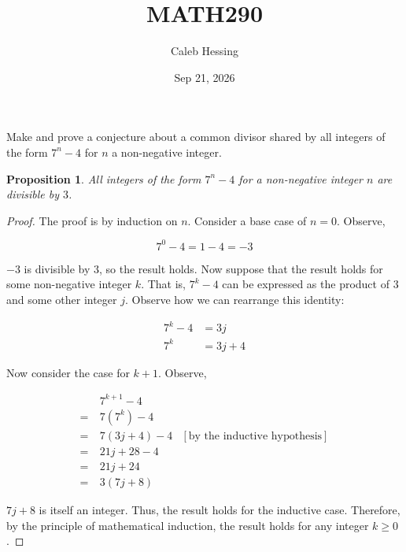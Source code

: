 \documentclass{article} %
\title{MATH290}
\author{Caleb Hessing}
\date{Sep 21, 2026}
\newtheorem{proposition}{Proposition}
\begin{document}
\maketitle

Make and prove a conjecture about a common divisor shared by all integers of the form
$7^n - 4$ for $n$ a non-negative integer.

\begin{proposition}
    All integers of the form $7^n - 4$ for a non-negative integer $n$ are divisible by $3$.
\end{proposition}

\begin{proof} The proof is by induction on $n$. Consider a base case of $n=0$. Observe,

    \[
        7^0 - 4 = 1 - 4 = -3 
    \]

    $-3$ is divisible by $3$, so the result holds. Now suppose that the result holds for some 
    non-negative integer $k$. That is, $7^k - 4$ can be expressed as the product of $3$ and 
    some other integer $j$. Observe how we can rearrange this identity:

    \[\begin{split}
        7^k - 4 &= 3j \\
        7^k &= 3j + 4
    \end{split}\]

    Now consider the case for $k+1$. Observe,

    \[\begin{aligned}
         &\ 7^{k+1} - 4 \\
        =&\ 7(7^k) - 4 \\
        =&\ 7(3j + 4) - 4 & [\text{by the inductive hypothesis}] \\
        =&\ 21j + 28 - 4 \\
        =&\ 21j + 24 \\
        =&\ 3(7j + 8)
    \end{aligned}
    \]

    $7j + 8$ is itself an integer. Thus, the result holds for the inductive case. Therefore,
    by the principle of mathematical induction, the result holds for any integer $k \ge 0$.

\end{proof}
\end{document}
